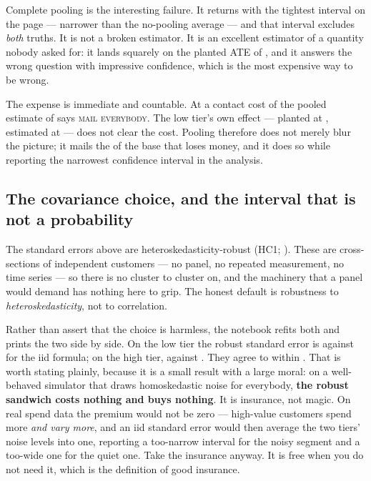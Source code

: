

Complete pooling is the interesting failure. It returns \eur{\nbTwoCpEst} with the tightest interval
on the page --- \pc{\nbTwoCpNarrowerPct} narrower than the no-pooling average --- and that interval
excludes \emph{both} truths. It is not a broken estimator. It is an excellent estimator of a
quantity nobody asked for: it lands squarely on the planted ATE of \eur{\nbTwoTrueAte}, and it
answers the wrong question with impressive confidence, which is the most expensive way to be wrong.

The expense is immediate and countable. At a contact cost of \eur{\nbTwoCost} the pooled estimate of
\eur{\nbTwoCpEst} says \textsc{mail everybody}. The low tier's own effect --- planted at
\eur{\nbTwoTrueLow}, estimated at \eur{\nbTwoNpLow} --- does not clear the cost. Pooling therefore
does not merely blur the picture; it mails the \pc{\nbTwoShareLow} of the base that loses money, and
it does so while reporting the narrowest confidence interval in the analysis.

\subsection*{The covariance choice, and the interval that is not a probability}

The standard errors above are heteroskedasticity-robust (HC1; \citealp{white1980, mackinnon1985}).
These are cross-sections of independent customers --- no panel, no repeated measurement, no time
series --- so there is no cluster to cluster on, and the \citet{liang1986} machinery that a panel
would demand has nothing here to grip. The honest default is robustness to
\emph{heteroskedasticity}, not to correlation.

Rather than assert that the choice is harmless, the notebook refits both and prints the two side by
side. On the low tier the robust standard error is \eur{\nbTwoSeRobustLow} against
\eur{\nbTwoSeIidLow} for the iid formula; on the high tier, \eur{\nbTwoSeRobustHigh} against
\eur{\nbTwoSeIidHigh}. They agree to within \pc{\nbTwoSeGapPct}. That is worth stating plainly,
because it is a small result with a large moral: on a well-behaved simulator that draws
homoskedastic noise for everybody, \textbf{the robust sandwich costs nothing and buys nothing}. It
is insurance, not magic. On real spend data the premium would not be zero --- high-value customers
spend more \emph{and vary more}, and an iid standard error would then average the two tiers' noise
levels into one, reporting a too-narrow interval for the noisy segment and a too-wide one for the
quiet one. Take the insurance anyway. It is free when you do not need it, which is the definition of
good insurance.

